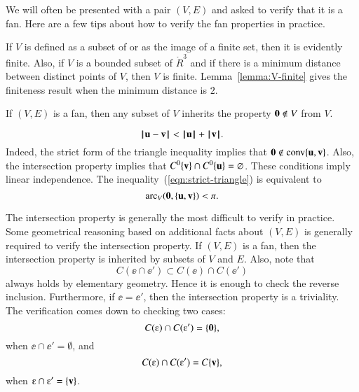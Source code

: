 \begin{remark}\label{remark:fan-verify}  
We will often be presented with a pair $(V,E)$ and asked to verify that it is a fan.  Here are a few tips about how to verify the fan properties in practice.
\begin{nomerate} 
\item {}  If $V$ is defined as a subset of or as the image of a finite set, then it is evidently finite.   Also, if $V$ is a bounded subset of $\ring{R}^3$ and if there is a minimum distance between distinct points of $V$, then $V$ is finite.  Lemma~\ref{lemma:V-finite} gives the finiteness result when the minimum distance is $2$.\vspace{6pt}
\item {}  If $(V,E)$ is a fan, then any subset of $V$ inherits the property ${\mathbf 0}\not\in V$ from $V$.  \vspace{6pt}
\item {} 
\begin{equation}\label{eqn:strict-triangle}
{\hskip0.1em|\hskip-0.15em|\hskip0.1em}{\mathbf u} - {\mathbf v}{\hskip0.1em|\hskip-0.15em|\hskip0.1em} < {{\hskip0.1em|\hskip-0.15em|\hskip0.1em}{\mathbf u}{\hskip0.1em|\hskip-0.15em|\hskip0.1em}} + {{\hskip0.1em|\hskip-0.15em|\hskip0.1em}{\mathbf v}{\hskip0.1em|\hskip-0.15em|\hskip0.1em}}.
\end{equation}
Indeed, the strict form of the triangle inequality implies that ${\mathbf 0}\not\in {\operatorname{conv}}\{{\mathbf u},{\mathbf v}\}$.  Also,
 the intersection property implies 
 that $C^0\{{\mathbf v}\} \cap C^0\{{\mathbf u}\} = \varnothing$.  These conditions imply linear independence.
The inequality~(\ref{eqn:strict-triangle}) is equivalent to
$$
\operatorname{arc}_V({\mathbf 0},\{{\mathbf u},{\mathbf v}\}) < \pi.
$$
\item {} The intersection property is generally the most difficult to verify in practice.  Some geometrical reasoning based on additional facts about $(V,E)$ is generally required to verify the intersection property.   If $(V,E)$ is a fan, then the intersection property is inherited by subsets of $V$ and $E$.  Also, note  that
$$
C(\ee\cap \ee') \subset C(\ee) \cap C(\ee')
$$
always holds by elementary geometry.  Hence it is enough to check the reverse inclusion.  Furthermore, if $\ee = \ee'$, then the intersection property is a triviality.  The verification comes down to checking two cases:
$$
C(\ee) \cap C(\ee') = \{\orz\},
$$
when $\ee\cap \ee' = \emptyset$, and
$$
C(\ee)\cap C(\ee') = C\{\v\},
$$
when $\ee\cap \ee' = \{\v\}$.
\end{nomerate}
\end{remark}


